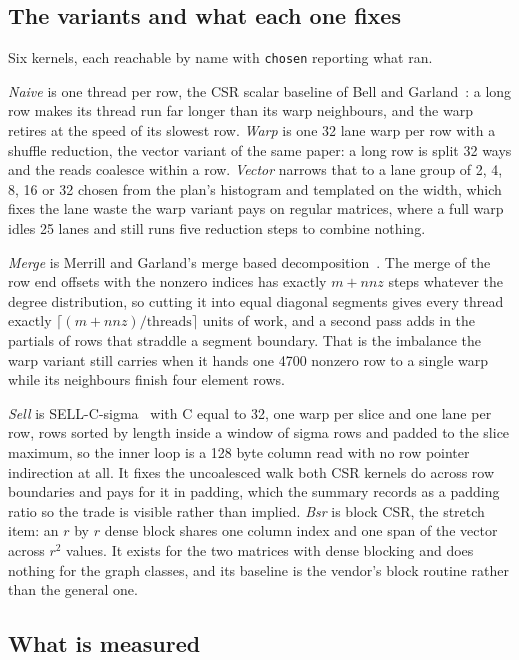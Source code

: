 \subsection{The variants and what each one fixes}

Six kernels, each reachable by name with \texttt{chosen} reporting what ran.

\emph{Naive} is one thread per row, the CSR scalar baseline of Bell and
Garland~\cite{bell2009}: a long row makes its thread run far longer than its warp
neighbours, and the warp retires at the speed of its slowest row. \emph{Warp} is
one 32 lane warp per row with a shuffle reduction, the vector variant of the same
paper: a long row is split 32 ways and the reads coalesce within a row.
\emph{Vector} narrows that to a lane group of 2, 4, 8, 16 or 32 chosen from the
plan's histogram and templated on the width, which fixes the lane waste the warp
variant pays on regular matrices, where a full warp idles 25 lanes and still runs
five reduction steps to combine nothing.

\emph{Merge} is Merrill and Garland's merge based decomposition~\cite{merrill2016spmv}.
The merge of the row end offsets with the nonzero indices has exactly $m + nnz$
steps whatever the degree distribution, so cutting it into equal diagonal segments
gives every thread exactly $\lceil (m + nnz) / \text{threads} \rceil$ units of
work, and a second pass adds in the partials of rows that straddle a segment
boundary. That is the imbalance the warp variant still carries when it hands one
4700 nonzero row to a single warp while its neighbours finish four element rows.

\emph{Sell} is SELL-C-sigma~\cite{kreutzer2014} with C equal to 32, one warp per
slice and one lane per row, rows sorted by length inside a window of sigma rows and
padded to the slice maximum, so the inner loop is a 128 byte column read with no
row pointer indirection at all. It fixes the uncoalesced walk both CSR kernels do
across row boundaries and pays for it in padding, which the summary records as a
padding ratio so the trade is visible rather than implied. \emph{Bsr} is block CSR,
the stretch item: an $r$ by $r$ dense block shares one column index and one span of
the vector across $r^2$ values. It exists for the two matrices with dense blocking
and does nothing for the graph classes, and its baseline is the vendor's block
routine rather than the general one.

\subsection{What is measured}

